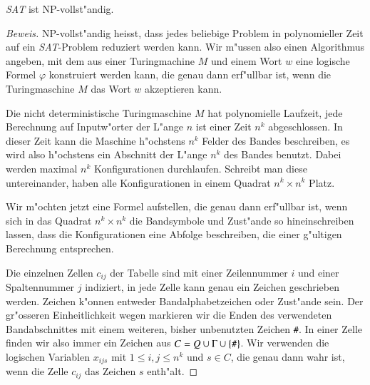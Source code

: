 \begin{satz}
\label{cooklevin}
\textsl{SAT} ist NP-vollst"andig.
\end{satz}

\begin{proof}[Beweis]
NP-vollst"andig heisst, dass jedes beliebige Problem in polynomieller
Zeit auf ein \textsl{SAT}-Problem reduziert werden kann.
Wir m"ussen
also einen Algorithmus angeben, mit dem aus einer Turingmachine
$M$ und einem Wort $w$
eine logische Formel $\varphi$ konstruiert werden kann, die genau
dann erf"ullbar ist, wenn die Turingmaschine $M$ das Wort $w$
akzeptieren kann.

Die nicht deterministische Turingmaschine $M$ hat polynomielle Laufzeit,
jede Berechnung auf Inputw"orter der L"ange $n$ ist einer Zeit $n^k$
abgeschlossen. In dieser Zeit kann die Maschine h"ochstens $n^k$ Felder
des Bandes beschreiben, es wird also h"ochstens ein Abschnitt der
L"ange $n^k$ des Bandes benutzt. Dabei werden maximal $n^k$
Konfigurationen durchlaufen. Schreibt man diese untereinander,
haben alle Konfigurationen in einem Quadrat $n^k\times n^k$
Platz.

Wir m"ochten jetzt eine Formel aufstellen, die genau dann erf"ullbar
ist, wenn sich in das Quadrat $n^k\times n^k$ die Bandsymbole und
Zust"ande so hineinschreiben lassen, dass die Konfigurationen eine
Abfolge beschreiben, die einer g"ultigen Berechnung entsprechen.

Die einzelnen Zellen $c_{ij}$ der Tabelle sind mit einer Zeilennummer $i$
und einer Spaltennummer $j$ indiziert, in jede Zelle kann
genau ein Zeichen geschrieben werden.
Zeichen k"onnen entweder Bandalphabetzeichen oder Zust"ande sein.
Der gr"osseren Einheitlichkeit wegen markieren wir die Enden des verwendeten
Bandabschnittes mit einem weiteren, bisher unbenutzten Zeichen {\tt\#}.
In einer Zelle finden wir also immer ein Zeichen aus $C=Q\cup \Gamma\cup\{\text{\tt\#}\}$.
Wir verwenden die logischen
Variablen $x_{ijs}$ mit $1\le i,j\le n^k$ und $s\in C$, die
genau dann wahr ist, wenn die Zelle $c_{ij}$ das Zeichen $s$ enth"alt.


\end{proof}
